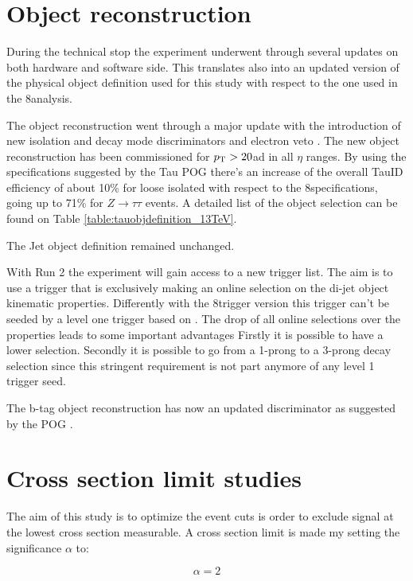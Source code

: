 \section{Object reconstruction}

During the technical stop the experiment underwent through several updates on both hardware and software side. This	translates also into an updated version of the physical object definition used for this study with respect to the one used in the 8\tev analysis.

The \hadtau object reconstruction went through a major update with the introduction of new isolation and decay mode discriminators and electron veto \cite{bib:TauID_13tev}. The new \hadtau object reconstruction has been commissioned for $p_{\text{T}} > 20$\gev ad in all $\eta$ ranges. By using the specifications suggested by the Tau POG there's an increase of the overall TauID efficiency of about 10\% for loose isolated \hadtau with respect to the 8\tev specifications, going up to 71\% for $Z \longrightarrow\tau\tau$ events\cite{bib:TauID_13tev}. A detailed list of the \hadtau object selection can be found on Table \ref{table:tauobjdefinition_13TeV}. 

The Jet object definition remained unchanged.  

With Run 2 the experiment will gain access to a new trigger list. The aim is to use a trigger that is exclusively making an online selection on the di-jet object kinematic properties. Differently with the 8\tev trigger version this trigger can't be seeded by a level one trigger based on \met. The drop of all online selections over the \hadtau properties leads to some important advantages Firstly it is possible to have a lower \hadtau \pt selection. Secondly it is possible to go from a 1-prong to a 3-prong decay selection since this stringent requirement is not part anymore of any level 1 trigger seed. 

The b-tag object reconstruction has now an updated discriminator as suggested by the POG \cite{bib:BJetID_13tev}.

\section{Cross section limit studies}

The aim of this study is to optimize the event cuts is order to exclude signal at the lowest cross section measurable. A cross section limit is made my setting the significance $\alpha$ to:

\begin{equation}
\alpha = 2
\label{eq::significance_xsec_limit}
\end{equation}

